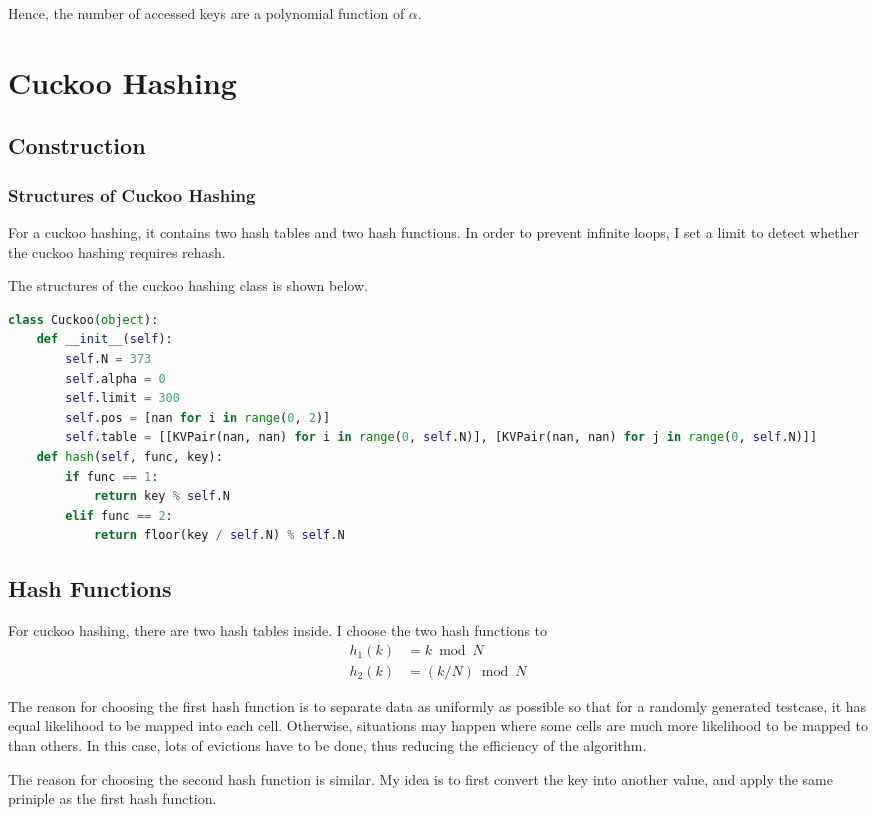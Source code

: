 \documentclass{article}
\begin{document}
\begin{spacing}{1.2}
\begin{itemize}
    Hence, the number of accessed keys are a polynomial function of $\alpha$.
\end{itemize}

\section{Cuckoo Hashing}
\subsection{Construction}
\subsubsection{Structures of Cuckoo Hashing}
For a cuckoo hashing, it contains two hash tables and two hash functions. In order to prevent infinite loops, I set a limit to detect whether the cuckoo hashing requires rehash.

The structures of the cuckoo hashing class is shown below.
\begin{lstlisting}[language=Python]
class Cuckoo(object):
    def __init__(self):
        self.N = 373
        self.alpha = 0
        self.limit = 300
        self.pos = [nan for i in range(0, 2)]
        self.table = [[KVPair(nan, nan) for i in range(0, self.N)], [KVPair(nan, nan) for j in range(0, self.N)]]
    def hash(self, func, key):
        if func == 1:
            return key % self.N
        elif func == 2:
            return floor(key / self.N) % self.N
\end{lstlisting}

\subsection{Hash Functions}
For cuckoo hashing, there are two hash tables inside. I choose the two hash functions to
\begin{align*}
    h_1(k) &= k\bmod N\\
    h_2(k) &= (k / N) \bmod N
\end{align*}

The reason for choosing the first hash function is to separate data as uniformly as possible so that for a randomly generated testcase, it has equal likelihood to be mapped into each cell. Otherwise, situations may happen where some cells are much more likelihood to be mapped to than others. In this case, lots of evictions have to be done, thus reducing the efficiency of the algorithm.

The reason for choosing the second hash function is similar. My idea is to first convert the key into another value, and apply the same priniple as the first hash function.


\end{spacing}
\end{document}
